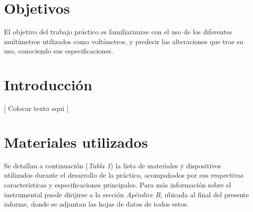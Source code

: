 \documentclass{article}
\begin{document}
\section{Objetivos}

	El objetivo del trabajo práctico es familiarizarse con el uso de los diferentes multímetros utilizados como voltímetros, y predecir las alteraciones que trae su uso, conociendo sus especificaciones.
\bigskip



\section{Introducción}

	[ Colocar texto aquí ]
\bigskip




\section{Materiales utilizados}

	Se detallan a continuación (\textit{Tabla 1}) la lista de materiales y dispositivos utilizados durante el desarrollo de la práctica, acompañados por sus respectivas características y especificaciones principales. Para más información sobre el instrumental puede dirijirse a la sección \textit{Apéndice B}, ubicada al final del presente informe, donde se adjuntan las hojas de datos de todos estos.
\bigskip\bigskip
\end{document}
